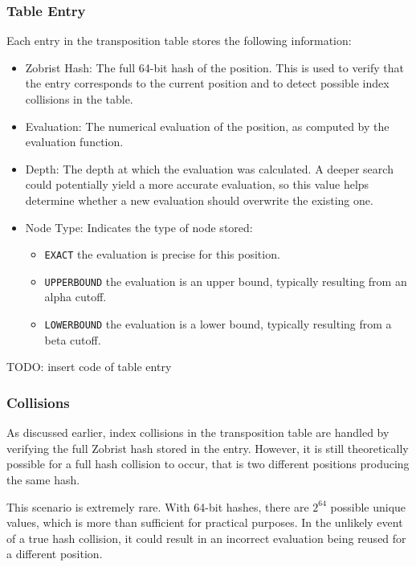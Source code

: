 \subsubsection{Table Entry}

Each entry in the transposition table stores the following information:

\begin{itemize}
  \item Zobrist Hash: The full 64-bit hash of the position. This is used to verify that the entry corresponds to the current position and to detect possible index collisions in the table.
  \item Evaluation: The numerical evaluation of the position, as computed by the evaluation function.
  \item Depth: The depth at which the evaluation was calculated. A deeper search could potentially yield a more accurate evaluation, so this value helps determine whether a new evaluation should overwrite the existing one.
  \item Node Type: Indicates the type of node stored:
  \begin{itemize}
    \item \texttt{EXACT} the evaluation is precise for this position.
    \item \texttt{UPPERBOUND} the evaluation is an upper bound, typically resulting from an alpha cutoff.
    \item \texttt{LOWERBOUND} the evaluation is a lower bound, typically resulting from a beta cutoff.
  \end{itemize}
\end{itemize}

TODO: insert code of table entry

\subsubsection{Collisions}

As discussed earlier, index collisions in the transposition table are handled by verifying the full Zobrist hash stored in the entry. However, it is still theoretically possible for a full hash collision to occur, that is two different positions producing the same hash.

\vspace{1em}

\noindent This scenario is extremely rare. With 64-bit hashes, there are $2^{64}$ possible unique values, which is more than sufficient for practical purposes. In the unlikely event of a true hash collision, it could result in an incorrect evaluation being reused for a different position.

